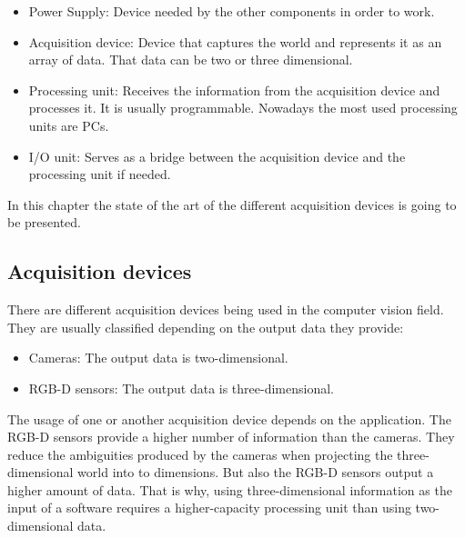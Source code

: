 \begin{itemize}
	\item{Power Supply: } Device needed by the other components in order to work. 
	\item{Acquisition device: } Device that captures the world and represents it as an array of data. That data can be two or three dimensional. 
	\item{Processing unit:} Receives the information from the acquisition device and processes it. It is usually programmable. Nowadays the most used processing units are PCs. 
	\item{I/O unit: } Serves as a bridge between the acquisition device and the processing unit if needed. 

\end{itemize}

In this chapter the state of the art of the different acquisition devices is going to be presented. 

\subsection{Acquisition devices}
There are different acquisition devices being used in the computer vision field. 
They are usually classified depending on the output data they provide: 

\begin{itemize}
	\item{Cameras:}	The output data is two-dimensional. 
	\item{RGB-D sensors:} The output data is three-dimensional. 
\end{itemize}

The usage of one or another acquisition device depends on the application. 
The RGB-D sensors provide a higher number of information than the cameras. 
They reduce the ambiguities produced by the cameras when projecting the three-dimensional world into to dimensions. 
But also the RGB-D sensors output a higher amount of data. 
That is why, using three-dimensional information as the input of a software requires a higher-capacity processing unit than using two-dimensional data.



